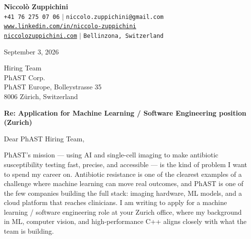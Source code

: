 



\begin{center}
    \textbf{\Huge Niccol\`o Zuppichini} \\ \vspace{5pt}
    \small \faPhone* \texttt{+41 76 275 07 06} \hspace{1pt} $|$
    \hspace{1pt} \faEnvelope \hspace{2pt} \texttt{niccolo.zuppichini@gmail.com} \hspace{1pt} \\
    \hspace{1pt} \faLinkedin \hspace{2pt} \texttt{\href{https://www.linkedin.com/in/niccolo-zuppichini}{www.linkedin.com/in/niccolo-zuppichini}} \hspace{1pt} \\
    \hspace{1pt} \faHome \hspace{2pt}\texttt{\href{niccolozuppichini.com}{niccolozuppichini.com}} \hspace{1pt} $|$
    \hspace{1pt} \faMapMarker* \hspace{2pt}\texttt{Bellinzona, Switzerland}
    \\ \vspace{10pt}
\end{center}

\noindent September 3, 2026

\vspace{10pt}
\noindent
Hiring Team \\
PhAST Corp. \\
PhAST Europe, Bolleystrasse 35 \\
8006 Z\"urich, Switzerland

\vspace{15pt}
\noindent\textbf{Re: Application for Machine Learning / Software Engineering position (Zurich)}

\vspace{15pt}
Dear PhAST Hiring Team,

PhAST's mission --- using AI and single-cell imaging to make antibiotic susceptibility testing fast, precise, and accessible --- is the kind of problem I want to spend my career on. Antibiotic resistance is one of the clearest examples of a challenge where machine learning can move real outcomes, and PhAST is one of the few companies building the full stack: imaging hardware, ML models, and a cloud platform that reaches clinicians. I am writing to apply for a machine learning / software engineering role at your Zurich office, where my background in ML, computer vision, and high-performance C++ aligns closely with what the team is building.

